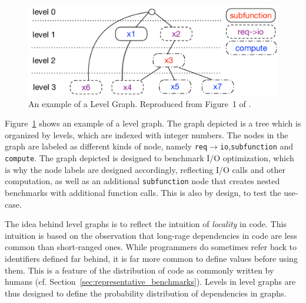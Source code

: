 \begin{figure}[th]
	\centering
	\includegraphics[width=\textwidth]{figures/level-graph.pdf}
	\caption{An example of a Level Graph. Reproduced from Figure~1 of \cite{goens_multiprog18}.}
	\label{fig:level_graph}
\end{figure}

Figure~\ref{fig:level_graph} shows an example of a level graph. The graph depicted is a tree which is organized by levels, which are indexed with integer numbers.
The nodes in the graph are labeled as different kinds of node, namely \texttt{req$\rightarrow$io},\texttt{subfunction} and \texttt{compute}.
The graph depicted is designed to benchmark \ac{I/O} optimization, which is why the node labels are designed accordingly, reflecting \ac{I/O} calls and other computation,
as well as an additional \texttt{subfunction} node that creates nested benchmarks with additional function calls.
This is also by design, to test the use-case.

The idea behind level graphs is to reflect the intuition of \emph{locality} in code.
This intuition is based on the observation that long-rage dependencies in code are less common than short-ranged ones.
While programmers do sometimes refer back to identifiers defined far behind, it is far more common to define values before using them.
This is a feature of the distribution of code as commonly written by humans (cf. Section~\ref{sec:representative_benchmarks}).
Levels in level graphs are thus designed to define the probability distribution of dependencies in graphs.

